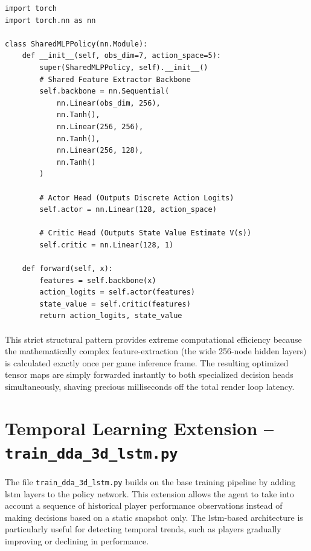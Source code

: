 \begin{verbatim}
import torch
import torch.nn as nn

class SharedMLPPolicy(nn.Module):
    def __init__(self, obs_dim=7, action_space=5):
        super(SharedMLPPolicy, self).__init__()
        # Shared Feature Extractor Backbone
        self.backbone = nn.Sequential(
            nn.Linear(obs_dim, 256),
            nn.Tanh(),
            nn.Linear(256, 256),
            nn.Tanh(),
            nn.Linear(256, 128),
            nn.Tanh()
        )
        
        # Actor Head (Outputs Discrete Action Logits)
        self.actor = nn.Linear(128, action_space)
        
        # Critic Head (Outputs State Value Estimate V(s))
        self.critic = nn.Linear(128, 1)

    def forward(self, x):
        features = self.backbone(x)
        action_logits = self.actor(features)
        state_value = self.critic(features)
        return action_logits, state_value
\end{verbatim}

\paragraph{} This strict structural pattern provides extreme computational efficiency because the mathematically complex feature-extraction (the wide 256-node hidden layers) is calculated exactly once per game inference frame. The resulting optimized tensor maps are simply forwarded instantly to both specialized decision heads simultaneously, shaving precious milliseconds off the total render loop latency.

\section{Temporal Learning Extension -- \texttt{train\_dda\_3d\_lstm.py}}
\paragraph{} The file \texttt{train\_dda\_3d\_lstm.py} builds on the base training pipeline by adding \ac{lstm} layers to the policy network. This extension allows the agent to take into account a sequence of historical player performance observations instead of making decisions based on a static snapshot only. The \ac{lstm}-based architecture is particularly useful for detecting temporal trends, such as players gradually improving or declining in performance.

